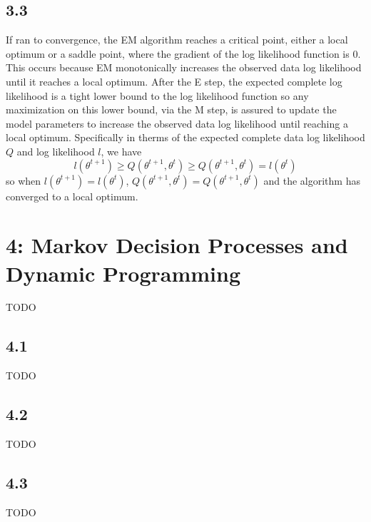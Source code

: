 \documentclass[12pt]{amsart}
\begin{document}
\subsection*{3.3}
If ran to convergence, the EM algorithm reaches a critical point, either a local optimum or a saddle point, where the gradient of the log likelihood function is 0.  This occurs because EM monotonically increases the observed data log likelihood until it reaches a local optimum.  After the E step, the expected complete log likelihood is a tight lower bound to the log likelihood function so any maximization on this lower bound, via the M step, is assured to update the model parameters to increase the observed data log likelihood until reaching a local optimum.  Specifically in therms of the expected complete data log likelihood $Q$ and log likelihood $l$, we have
\begin{equation}
l(\theta^{t+1}) \geq Q(\theta^{t+1},\theta^{t}) \geq Q(\theta^{t+1},\theta^{t}) = l(\theta^{t}) 
\end{equation}
so when $l(\theta^{t+1}) = l(\theta^{t})$, $Q(\theta^{t+1},\theta^{t}) = Q(\theta^{t+1},\theta^{t})$ and the algorithm has converged to a local optimum.

\section*{4: Markov Decision Processes and Dynamic Programming}
TODO

\subsection*{4.1}
TODO

\subsection*{4.2}
TODO

\subsection*{4.3}
TODO
\end{document}
